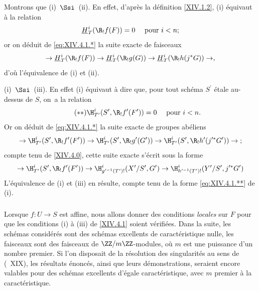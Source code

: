 Montrons que \textup{(i)}~$\Ssi$~\textup{(ii)}. En effet, d'apr\`es la d\'efinition \ref{XIV.1.2}, \textup{(i)} \'equivaut \`a la relation
$$
\underline{H}_{T}^{i}(\R_{!}f(F))=0\quad\textrm{ pour }i<n\textrm{;}$$
or on d\'eduit de \eqref{eq:XIV.4.1.*} la suite exacte de faisceaux
$$
\to\underline{H}_{T}^{i}(\R_{!}f(F))\to\underline{H}_{T}^{i}(\R_{!}g(G))\to\underline{H}_{T}^{i}(\R_{!}h(j^{\ast}G))\to,
$$
d'o\`u l'\'equivalence de \textup{(i)} et \textup{(ii)}.

\textup{(i)}~$\Ssi$~\textup{(iii)}. En effet \textup{(i)} \'equivaut \`a dire que, pour tout sch\'ema $S^{\prime}$ \'etale au-dessus de $S$, on~a la relation
\begin{equation*} \label{eq:XIV.4.1.**} \tag{$**$} {\H_{T^{\prime}}^{i}(S^{\prime}, \R_{!}f^{\prime}(F^{\prime}))=0\quad\textrm{ pour }i<n.}
\end{equation*}
Or on d\'eduit de \eqref{eq:XIV.4.1.*} la suite exacte de groupes ab\'eliens
$$
\to\H_{T^{\prime}}^{i}(S^{\prime}, \R_{!}f^{\prime}(F^{\prime}))\to\H_{T^{\prime}}^{i}(S^{\prime}, \R_{!}g^{\prime}(G^{\prime}))\to \H_{T^{\prime}}^{i}(S^{\prime}, \R_{!}h^{\prime}(j^{\prime\ast}G^{\prime}))\to\;;$$
compte tenu de \ref{XIV.4.0}, cette suite exacte s'\'ecrit sous la forme
$$
\to\H_{T^{\prime}}^{i}(S^{\prime}, \R_{!}f^{\prime}(F^{\prime}))\to\H_{g^{\prime -1}(T^{\prime})!}^{i}(X^{\prime}/S^{\prime}, G^{\prime})\to\H_{h^{\prime -1}(T^{\prime})!}^{i}(Y^{\prime}/S^{\prime}, j^{\prime\ast}G^{\prime})$$
L'\'equivalence de \textup{(i)} et \textup{(iii)} en r\'esulte, compte tenu de la forme \eqref{eq:XIV.4.1.**} de \textup{(i)}.

\setcounter{subsubsection}{-1} \setcounter{subsection}{2}

\subsubsection{} \label{XIV.4.2.0}
Lorsque $f\colon U\to S$ est affine, nous allons donner des conditions \emph{locales} sur $F$ pour que les conditions \textup{(i)} \`a \textup{(iii)} de \ref{XIV.4.1} soient v\'erifi\'ees. Dans la suite, les sch\'emas consid\'er\'es sont des sch\'emas excellents de caract\'eristique nulle, les faisceaux sont des faisceaux de $\ZZ/m\ZZ$-modules, o\`u $m$ est une puissance d'un nombre premier. Si l'on disposait de la r\'esolution des singularit\'es au sens de (~XIX), les r\'esultats \'enonc\'es, ainsi que leurs d\'emonstrations, seraient encore valables pour des sch\'emas excellents d'\'egale caract\'eristique, avec $m$ premier \`a la caract\'eristique.

